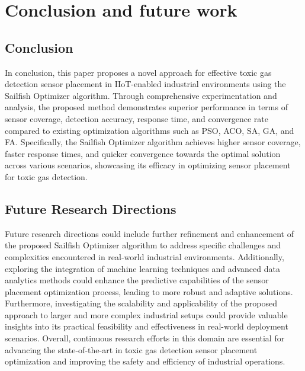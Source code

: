 \documentclass[conference]{IEEEtran}
\begin{document}
\section{Conclusion and future work}\label{sec5}
\subsection{Conclusion}
In conclusion, this paper proposes a novel approach for effective toxic gas detection sensor placement in IIoT-enabled industrial environments using the Sailfish Optimizer algorithm. Through comprehensive experimentation and analysis, the proposed method demonstrates superior performance in terms of sensor coverage, detection accuracy, response time, and convergence rate compared to existing optimization algorithms such as PSO, ACO, SA, GA, and FA. Specifically, the Sailfish Optimizer algorithm achieves higher sensor coverage, faster response times, and quicker convergence towards the optimal solution across various scenarios, showcasing its efficacy in optimizing sensor placement for toxic gas detection.

\subsection{Future Research Directions}
Future research directions could include further refinement and enhancement of the proposed Sailfish Optimizer algorithm to address specific challenges and complexities encountered in real-world industrial environments. Additionally, exploring the integration of machine learning techniques and advanced data analytics methods could enhance the predictive capabilities of the sensor placement optimization process, leading to more robust and adaptive solutions. Furthermore, investigating the scalability and applicability of the proposed approach to larger and more complex industrial setups could provide valuable insights into its practical feasibility and effectiveness in real-world deployment scenarios. Overall, continuous research efforts in this domain are essential for advancing the state-of-the-art in toxic gas detection sensor placement optimization and improving the safety and efficiency of industrial operations.
 

\end{document}
